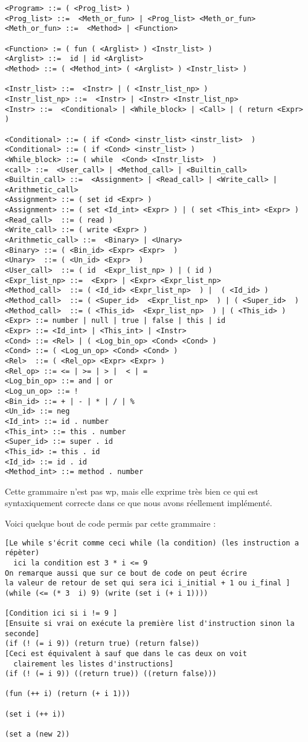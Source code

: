 \begin{verbatim}
<Program> ::= ( <Prog_list> )
<Prog_list> ::=  <Meth_or_fun> | <Prog_list> <Meth_or_fun>	
<Meth_or_fun> ::=  <Method> | <Function>

<Function> := ( fun ( <Arglist> ) <Instr_list> ) 
<Arglist> ::=  id | id <Arglist>
<Method> ::= ( <Method_int> ( <Arglist> ) <Instr_list> )
 
<Instr_list> ::=  <Instr> | ( <Instr_list_np> ) 
<Instr_list_np> ::=  <Instr> | <Instr> <Instr_list_np>
<Instr> ::=  <Conditional> | <While_block> | <Call> | ( return <Expr> ) 

<Conditional> ::= ( if <Cond> <instr_list> <instr_list>  )  
<Conditional> ::= ( if <Cond> <instr_list> )
<While_block> ::= ( while  <Cond> <Instr_list>  ) 
<call> ::=  <User_call> | <Method_call> | <Builtin_call> 
<Builtin_call> ::=  <Assignment> | <Read_call> | <Write_call> | <Arithmetic_call>
<Assignment> ::= ( set id <Expr> ) 
<Assignment> ::= ( set <Id_int> <Expr> ) | ( set <This_int> <Expr> )
<Read_call>  ::= ( read )
<Write_call> ::= ( write <Expr> )
<Arithmetic_call> ::=  <Binary> | <Unary>
<Binary> ::= ( <Bin_id> <Expr> <Expr>  )
<Unary>  ::= ( <Un_id> <Expr>  )
<User_call>  ::= ( id  <Expr_list_np> ) | ( id ) 
<Expr_list_np> ::=  <Expr> | <Expr> <Expr_list_np>
<Method_call>  ::= ( <Id_id> <Expr_list_np>  ) |  ( <Id_id> )   
<Method_call>  ::= ( <Super_id>  <Expr_list_np>  ) | ( <Super_id>  )
<Method_call>  ::= ( <This_id>  <Expr_list_np>  ) | ( <This_id> )
<Expr> ::= number | null | true | false | this | id 
<Expr> ::= <Id_int> | <This_int> | <Instr>
<Cond> ::= <Rel> | ( <Log_bin_op> <Cond> <Cond> )
<Cond> ::= ( <Log_un_op> <Cond> <Cond> )
<Rel>  ::= ( <Rel_op> <Expr> <Expr> ) 
<Rel_op> ::= <= | >= | > |  < | =
<Log_bin_op> ::= and | or
<Log_un_op> ::= !
<Bin_id> ::= + | - | * | / | %
<Un_id> ::= neg
<Id_int> ::= id . number
<This_int> ::= this . number
<Super_id> ::= super . id
<This_id> := this . id 
<Id_id> ::= id . id
<Method_int> ::= method . number
\end{verbatim}
Cette grammaire n'est pas wp, mais elle exprime très bien ce qui est syntaxiquement correcte dans ce que nous avons réellement implémenté. 

Voici quelque bout de code permis par cette grammaire :

\begin{verbatim}
[Le while s'écrit comme ceci while (la condition) (les instruction a répèter)
  ici la condition est 3 * i <= 9
On remarque aussi que sur ce bout de code on peut écrire 
la valeur de retour de set qui sera ici i_initial + 1 ou i_final ]
(while (<= (* 3  i) 9) (write (set i (+ i 1)))) 
  
[Condition ici si i != 9 ]
[Ensuite si vrai on exécute la première list d'instruction sinon la seconde]
(if (! (= i 9)) (return true) (return false))
[Ceci est équivalent à sauf que dans le cas deux on voit 
  clairement les listes d'instructions]
(if (! (= i 9)) ((return true)) ((return false)))

(fun (++ i) (return (+ i 1)))

(set i (++ i))

(set a (new 2))
\end{verbatim}

